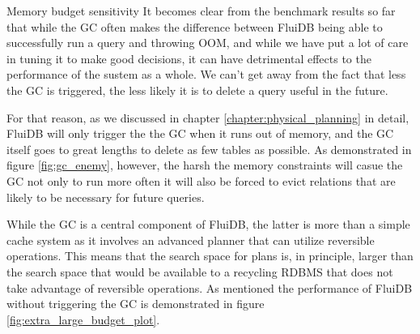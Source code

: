 \begin{corrected}{Memory budget sensitivity}
  It becomes clear from the benchmark results so far that while the GC
  often makes the difference between FluiDB being able to successfully
  run a query and throwing OOM, and while we have put a lot of care in
  tuning it to make good decisions, it can have detrimental effects to
  the performance of the sustem as a whole. We can't get away from the
  fact that less the GC is triggered, the less likely it is to delete a
  query useful in the future.

  For that reason, as we discussed in chapter \ref{chapter:physical_planning}
  in detail, FluiDB will only trigger the the GC when it runs out of
  memory, and the GC itself goes to great lengths to delete as few
  tables as possible. As demonstrated in figure \ref{fig:gc_enemy},
  however, the harsh the memory constraints will casue the GC not only
  to run more often it will also be forced to evict relations that are
  likely to be necessary for future queries.

  While the GC is a central component of FluiDB, the latter is more than
  a simple cache system as it involves an advanced planner that can
  utilize reversible operations. This means that the search space for
  plans is, in principle, larger than the search space that would be
  available to a recycling RDBMS that does not take advantage of
  reversible operations. As mentioned the performance of FluiDB without
  triggering the GC is demonstrated in figure
  \ref{fig:extra_large_budget_plot}.
\end{corrected}


